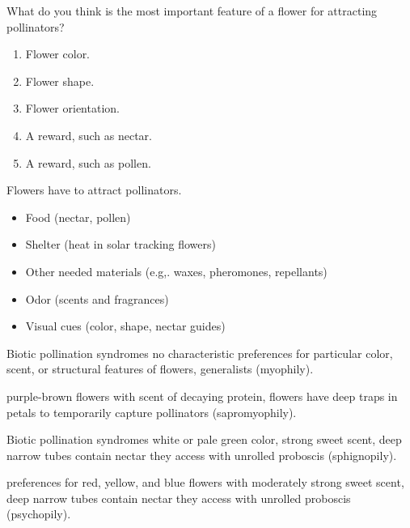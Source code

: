 \documentclass[t,hidelinks]{beamer}
\newcommand{\ques}[1]{\highlight{\textsc{q#1:}}}
\begin{document}
%
\begin{frame}[t]{\ques6 What do you think is the most important feature of a flower for attracting pollinators?}
	
	\begin{enumerate}
		\item Flower color.
		
		\item Flower shape.
		
		\item Flower orientation.
		
		\item A reward, such as nectar.
		
		\item A reward, such as pollen.

	\end{enumerate}
\end{frame}
%
\begin{frame}[t]{Flowers have  to attract pollinators.}
	\hangpara {}
	\begin{itemize}
		\item Food (nectar, pollen)
		\item Shelter (heat in solar tracking flowers)
		\item Other needed materials (e.g,. waxes, pheromones, repellants)
	\end{itemize}

	\hangpara {}
	\begin{itemize}
		\item Odor (scents and fragrances)
		\item Visual cues (color, shape, nectar guides)
	\end{itemize}
\end{frame}
%
\begin{frame}[t]{Biotic pollination syndromes}
	\hangpara {} no characteristic preferences for particular color, scent, or structural features of flowers, generalists (myophily).
	
	\hangpara {} purple-brown flowers with scent of decaying protein, flowers have deep traps in petals to temporarily capture pollinators (sapromyophily).

\end{frame}
%
\begin{frame}[t]{Biotic pollination syndromes}
	\hangpara {} white or pale green color, strong sweet scent, deep narrow tubes contain nectar they access with unrolled proboscis (sphignopily).
	
	\hangpara {} preferences for red, yellow, and blue flowers with moderately strong sweet scent, deep narrow tubes contain nectar they access with unrolled proboscis (psychopily).
	
\end{frame}
\end{document}
